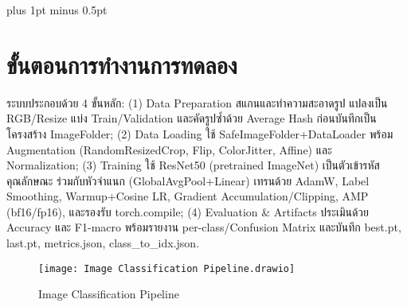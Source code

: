 
\clearpage
\thispagestyle{plain}

\begingroup
\fontsize{16pt}{19.2pt}\selectfont
\justifying
\XeTeXlinebreakskip=0pt plus 1pt minus 0.5pt
\setlength{\parindent}{1.5cm}
\setlength{\parskip}{0pt}



\section*{ขั้นตอนการทำงานการทดลอง}
\indent ระบบประกอบด้วย 4 ขั้นหลัก: (1) Data Preparation สแกนและทำความสะอาดรูป แปลงเป็น RGB/Resize แบ่ง Train/Validation และคัดรูปซ้ำด้วย Average Hash ก่อนบันทึกเป็นโครงสร้าง ImageFolder; (2) Data Loading ใช้ SafeImageFolder+DataLoader พร้อม Augmentation (RandomResizedCrop, Flip, ColorJitter, Affine) และ Normalization; (3) Training ใช้ ResNet50 (pretrained ImageNet) เป็นตัวเข้ารหัสคุณลักษณะ ร่วมกับหัวจำแนก (GlobalAvgPool+Linear) เทรนด้วย AdamW, Label Smoothing, Warmup+Cosine LR, Gradient Accumulation/Clipping, AMP (bf16/fp16), และรองรับ torch.compile; (4) Evaluation \& Artifacts ประเมินด้วย Accuracy และ F1-macro พร้อมรายงาน per-class/Confusion Matrix และบันทึก best.pt, last.pt, metrics.json, class\_to\_idx.json.


\begin{figure}[h]
	\centering
	\texttt{[image: Image Classification Pipeline.drawio]}
	\caption{Image Classification Pipeline}
\end{figure}

\newpage

